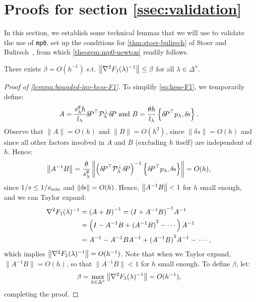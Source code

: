 \documentclass{article}
\begin{document}
\section{Proofs for section
  \ref{ssec:validation}}\label{app:validation-proofs} In this section, we establish some technical lemmas that we will use
to validate the use of
\texttt{mp0}. 
set up the conditions for \cref{thm:stoer-bulirsch} of Stoer and
Bulirsch~\cite{stoer2013introduction}, from which
\cref{theorem:mp0-newton} readily follows.

\begin{lemma}\label{lemma:bounded-inv-hess-F1}
  There exists $\beta = O(h^{-1})$ s.t.
  $\left\|\nabla^2 F_1(\lambda)^{-1}\right\| \leq \beta$ for all
  $\lambda \in \Delta^n$.
\end{lemma}

\begin{proof}[Proof of \cref{lemma:bounded-inv-hess-F1}]
  To simplify \cref{eq:hess-F1}, we temporarily define:
  \begin{equation}
    A = \frac{s^\theta_\lambda h}{l_\lambda} {\delta \hspace{-0.14em} P}^\top \mathcal{P}^\perp_\lambda {\delta \hspace{-0.14em} P} \mbox{ and } B = \frac{\theta h}{l_\lambda} \left\{{\delta \hspace{-0.14em} P}^\top p_\lambda, {\delta \hspace{-0.1em} s}\right\}.
  \end{equation}
  Observe that $\|A\| = O(h)$ and $\|B\| = O(h^2)$, since
  $\|\delta s\| = O(h)$ and since all other factors involved in $A$
  and $B$ (excluding $h$ itself) are independent of $h$. Hence:
  \begin{equation}
    \left\|A^{-1} B\right\| = \frac{\theta}{s^\theta_\lambda} \left\|\left({\delta \hspace{-0.14em} P}^\top \mathcal{P}^\perp_\lambda {\delta \hspace{-0.14em} P}\right)^{-1} \left\{{\delta \hspace{-0.14em} P}^\top p_\lambda, {\delta \hspace{-0.1em} s}\right\}\right\| = O(h),
  \end{equation}
  since $1/s \leq 1/s_{\operatorname{min}}$ and $\left\|{\delta \hspace{-0.1em} s}\right\| = O(h)$. Hence,
  $\left\|A^{-1} B\right\| < 1$ for $h$ small enough, and we can Taylor
  expand:
  \begin{equation}
    \begin{aligned}
      \nabla^2 F_1(\lambda)^{-1} &= \left(A + B\right)^{-1} = {(I + A^{-1} B)}^{-1} A^{-1} \\
      &= \left(I - A^{-1} B + {(A^{-1} B)}^2 - \cdots\right) A^{-1} \\
      &= A^{-1} - A^{-1} B A^{-1} + {(A^{-1} B)}^2 A^{-1} - \,\cdots,
    \end{aligned}
  \end{equation}
  which implies $\left\|\nabla^2 F_1(\lambda)^{-1}\right\| = O(h^{-1})$. Note
  that when we Taylor expand, $\|A^{-1} B\| = O(h)$, so that
  $\|A^{-1} B\| < 1$ for $h$ small enough. To define $\beta$, let:
  \begin{equation}
    \beta = \max_{\lambda \in \Delta^n} \left\|\nabla^2 F_1(\lambda)^{-1}\right\| = O(h^{-1}),
  \end{equation}
  completing the proof.
\end{proof}
\end{document}
